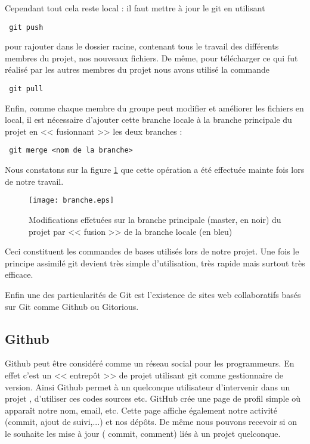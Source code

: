 Cependant tout cela reste local : il faut mettre \`a jour le git en utilisant
\begin{verbatim} git push \end{verbatim}
pour rajouter dans le dossier racine, contenant tous le travail des diff\'erents membres du projet, nos nouveaux fichiers. 
De m\^eme, pour t\'el\'echarger ce qui fut r\'ealis\'e par les autres membres du projet nous avons utilis\'e la commande
\begin{verbatim} git pull \end{verbatim}

Enfin, comme chaque membre du groupe peut modifier et am\'eliorer les fichiers en local, il est n\'ecessaire d'ajouter cette branche locale \`a la branche
principale du projet en << fusionnant >> les deux branches :
\begin{verbatim} git merge <nom de la branche>\end{verbatim}
Nous constatons sur la figure \ref{fig:branche} que cette op\'eration a \'et\'e effectu\'ee mainte fois lors de notre travail.

\begin{figure}[h]
\begin{center}
\texttt{[image: branche.eps]}
\end{center}
\caption{Modifications effetu\'ees sur la branche principale (master, en noir) du projet par << fusion >> de la branche locale (en bleu)}
\label{fig:branche}
\end{figure}

Ceci constituent les commandes de bases utilis\'es lors de notre projet. Une fois le principe assimil\'e git devient tr\`es simple d'utilisation,
 tr\`es rapide mais surtout tr\`es efficace.

Enfin une des particularit\'es de Git est l'existence de sites web collaboratifs bas\'es sur Git comme Github ou Gitorious. 

\subsection{Github}

Github peut \^etre consid\'er\'e comme un r\'eseau social pour les programmeurs. En effet c'est un << entrep\^ot >> de projet utilisant git comme 
gestionnaire de version. Ainsi Github permet \`a un quelconque utilisateur d'intervenir dans un projet , d'utiliser ces codes sources etc.
GitHub cr\'ee une page de profil simple o\`u appara\^it notre nom, email, etc. Cette page affiche \'egalement notre activit\'e (commit, ajout de suivi,...)
 et nos d\'ep\^ots. De m\^eme nous pouvons recevoir si on le souhaite les mise \`a  jour ( commit, comment) li\'es \`a un projet quelconque.

